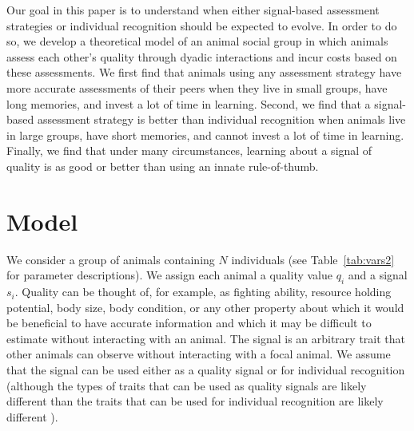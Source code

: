 Our goal in this paper is to understand when either signal-based assessment strategies or individual recognition should be expected to evolve.  In order to do so, we develop a theoretical model of an animal social group in which animals assess each other's quality through dyadic interactions and incur costs based on these assessments. We first find that animals using any assessment strategy have more accurate assessments of their peers when they live in small groups, have long memories, and invest a lot of time in learning. Second, we find that a signal-based assessment strategy is better than individual recognition when animals live in large groups, have short memories, and cannot invest a lot of time in learning. Finally, we find that under many circumstances, learning about a signal of quality is as good or better than using an innate rule-of-thumb. 
 

\section*{Model } 

We consider a group of animals containing $N$ individuals (see Table~\ref{tab:vars2} for parameter descriptions). We assign each animal a quality value $q_i$ and a signal $s_i$. Quality can be thought of, for example, as fighting ability, resource holding potential, body size, body condition, or any other property about which it would be beneficial to have accurate information and which it may be difficult to estimate without interacting with an animal. The signal is an arbitrary trait that other animals can observe without interacting with a focal animal.  We assume that the signal can be used either as a quality signal or for individual recognition (although the types of traits that can be used  as quality signals are likely different than the traits that can be used for individual recognition are likely different \citep{Dale:2001dv}).

